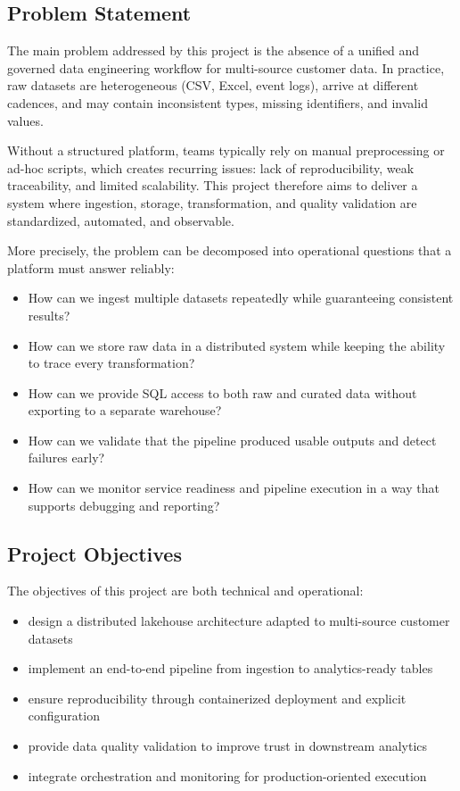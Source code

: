 \subsection{Problem Statement}
The main problem addressed by this project is the absence of a unified and governed data engineering workflow for multi-source customer data. In practice, raw datasets are heterogeneous (CSV, Excel, event logs), arrive at different cadences, and may contain inconsistent types, missing identifiers, and invalid values.

Without a structured platform, teams typically rely on manual preprocessing or ad-hoc scripts, which creates recurring issues: lack of reproducibility, weak traceability, and limited scalability. This project therefore aims to deliver a system where ingestion, storage, transformation, and quality validation are standardized, automated, and observable.

More precisely, the problem can be decomposed into operational questions that a platform must answer reliably:
\begin{itemize}
    \item How can we ingest multiple datasets repeatedly while guaranteeing consistent results?
    \item How can we store raw data in a distributed system while keeping the ability to trace every transformation?
    \item How can we provide SQL access to both raw and curated data without exporting to a separate warehouse?
    \item How can we validate that the pipeline produced usable outputs and detect failures early?
    \item How can we monitor service readiness and pipeline execution in a way that supports debugging and reporting?
\end{itemize}

\subsection{Project Objectives}
The objectives of this project are both technical and operational:
\begin{itemize}
    \item design a distributed lakehouse architecture adapted to multi-source customer datasets
    \item implement an end-to-end pipeline from ingestion to analytics-ready tables
    \item ensure reproducibility through containerized deployment and explicit configuration
    \item provide data quality validation to improve trust in downstream analytics
    \item integrate orchestration and monitoring for production-oriented execution
\end{itemize}

